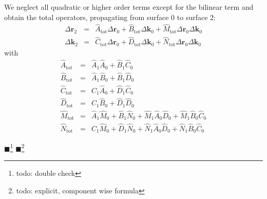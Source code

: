 \documentclass[12pt,a4paper,twoside,openright,BCOR10mm,headsepline,titlepage,abstracton,chapterprefix,final]{scrreprt}
\newcommand\Vector[1]{{\mathbf{#1}}}
\newcommand\wavenumber{k}
\newcommand\Wavevector{\Vector{\wavenumber}}
\newcommand{\remark}[1]{{\color{red}$\blacksquare$}\footnote{{\color{red}#1}}}
\newcommand\tot{\textrm{tot}}
\begin{document}
We neglect all quadratic or higher order terms except for the bilinear term and obtain the total operators, 
propagating from surface $0$ to surface $2$:
\begin{subequations}
\begin{eqnarray}
 \Delta \Vector{r}_2  &=& \hat{A}_\tot \Delta \Vector{r}_0 + \hat{B}_\tot \Delta \Vector{k}_0 + \hat{M}_\tot \Delta \Vector{r}_0 \Delta \Vector{k}_0 \\ 
 \Delta \Wavevector_2 &=& \hat{C}_\tot \Delta \Vector{r}_0 + \hat{D}_\tot \Delta \Vector{k}_0 + \hat{N}_\tot \Delta \Vector{r}_0 \Delta \Vector{k}_0
\end{eqnarray}
\end{subequations}
with
\begin{subequations}\label{eq:xyuv_total_propagation}
\begin{eqnarray}
 \hat{A}_\tot &=& \hat{A}_1 \hat{A}_0 + \hat{B}_1 \hat{C}_0 \\
 \hat{B}_\tot &=& \hat{A}_1 \hat{B}_0 + \hat{B}_1 \hat{D}_0 \\
 \hat{C}_\tot &=& \hat{C}_1 \hat{A}_0 + \hat{D}_1 \hat{C}_0\\
 \hat{D}_\tot &=& \hat{C}_1 \hat{B}_0 + \hat{D}_1 \hat{D}_0 \\
 \hat{M}_\tot &=& \hat{A}_1 \hat{M}_0 + \hat{B}_1 \hat{N}_0 + \hat{M}_1 \hat{A}_0 \hat{D}_0 + \hat{M}_1 \hat{B}_0 \hat{C}_0 \\
 \hat{N}_\tot &=& \hat{C}_1 \hat{M}_0 + \hat{D}_1 \hat{N}_0 + \hat{N}_1 \hat{A}_0 \hat{D}_0 + \hat{N}_1 \hat{B}_0 \hat{C}_0
\end{eqnarray}
 \end{subequations}
 
\remark{todo: double check}
\remark{todo: explicit, component wise formula}
\end{document}
